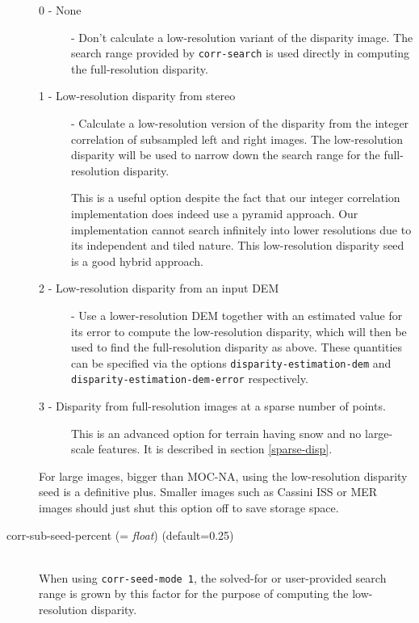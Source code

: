 \begin{description}
  \begin{description}
  \item[0 - None] - Don't calculate a low-resolution variant of the
    disparity image. The search range provided by \texttt{corr-search}
    is used directly in computing the full-resolution disparity.

  \item[1 - Low-resolution disparity from stereo] - Calculate a
    low-resolution version of the disparity from the integer correlation
    of subsampled left and right images.  The low-resolution disparity
    will be used to narrow down the search range for the full-resolution
    disparity.

    This is a useful option despite the fact that our integer
    correlation implementation does indeed use a pyramid approach. Our
    implementation cannot search infinitely into lower resolutions due
    to its independent and tiled nature. This low-resolution disparity
    seed is a good hybrid approach.

  \item[2 - Low-resolution disparity from an input DEM] - Use a
    lower-resolution DEM together with an estimated value for its error
    to compute the low-resolution disparity, which will then be used to
    find the full-resolution disparity as above. These quantities can be
    specified via the options \texttt{disparity-estimation-dem} and
    \texttt{disparity-estimation-dem-error} respectively.

  \item[3 - Disparity from full-resolution images at a sparse number of
    points.] This is an advanced option for terrain having snow and no
    large-scale features. It is described in section \ref{sparse-disp}.

  \end{description}

  For large images, bigger than MOC-NA, using the low-resolution
  disparity seed is a definitive plus. Smaller images such as Cassini
  ISS or MER images should just shut this option off to save storage
  space.

\item[corr-sub-seed-percent \textnormal{\small{(= \emph{float})}} (default=0.25)] \hfill \\
  When using \texttt{corr-seed-mode 1}, the solved-for or user-provided
  search range is grown by this factor for the purpose of computing the
  low-resolution disparity.


\end{description}
